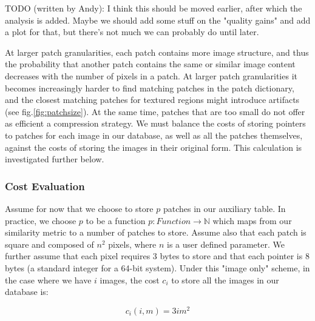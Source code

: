 
TODO (written by Andy): I think this should be moved earlier, after which the analysis is added.  Maybe we should add some stuff on the "quality gains" and add a plot for that, but there's not much we can probably do until later.

At larger patch granularities, each patch contains more image structure, and thus the probability that another patch contains the same or similar image content decreases with the number of pixels in a patch. At larger patch granularities it becomes increasingly harder to find matching patches in the patch dictionary, and the closest matching patches for textured regions might introduce artifacts (see fig.\ref{fig:patchsize}). At the same time, patches that are too small do not offer as efficient a compression strategy. We must balance the costs of storing pointers to patches for each image in our database, as well as all the patches themselves, against the costs of storing the images in their original form. This calculation is investigated further below. 


\subsubsection{Cost Evaluation}

Assume for now that we choose to store $p$ patches in our auxiliary table.  In practice, we choose $p$ to be a function $p \colon Function \to \mathds{N}$ which maps from our similarity metric to a number of patches to store.  Assume also that each patch is square and composed of $n^2$ pixels, where $n$ is a user defined parameter.  We further assume that each pixel requires 3 bytes to store  and that each pointer is 8 bytes (a standard integer for a 64-bit system).  Under this "image only" scheme, in the case where we have $i$ images, the cost $c_i$ to store all the images in our database is:

\begin{equation}
	c_i(i, m) = 3  i  m^2
\end{equation}

